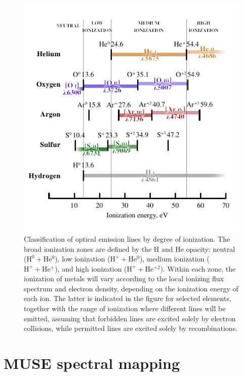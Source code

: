 \documentclass[twocolumn, times]{aastex631}
\newcommand*\chem[1]{\ensuremath{\mathrm{#1}}}
\begin{document}
\begin{figure}
  \centering
  \includegraphics{figs/ionization-potential-table}
  \caption{
    Classification of optical emission lines by degree of ionization.
    The broad ionization zones are defined by the H and He opacity:
    neutral (\(\chem{H^0} + \chem{He^0}\)),
    low ionization (\(\chem{H^+} + \chem{He^0}\)),
    medium ionization (\(\chem{H^+} + \chem{He^+}\)),
    and high ionization (\(\chem{H^+} + \chem{He^{+2}}\)).
    Within each zone, the ionization of metals will
    vary according to the local ionizing flux spectrum
    and electron density,
    depending on the ionization energy of each ion.
    The latter is indicated in the figure for selected elements,
    together with the range of ionization where different lines
    will be emitted, assuming that forbidden lines
    are excited solely by electron collisions,
    while permitted lines are excited solely by recombinations.
   }
  \label{fig:ion-energies}
\end{figure}

\section{MUSE spectral mapping}
\label{sec:observations}
\end{document}
